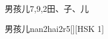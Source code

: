 \begin{entry}{男孩儿}{7,9,2}{⽥、⼦、⼉}
  \begin{phonetics}{男孩儿}{nan2hai2r5}[][HSK 1]
  \end{phonetics}
\end{entry}
